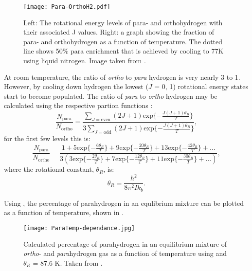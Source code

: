  \begin{figure*}
   \begin{center}
   \texttt{[image: Para-OrthoH2.pdf]}
   \end{center}
   \caption{Left: The rotational energy levels of para- and orthohydrogen with their associated J values. Right: a graph
   showing the fraction of para- and orthohydrogen as a function of temperature. The dotted line shows 50\% para
   enrichment that is achieved by cooling to 77K using liquid nitrogen. Image taken from \citep{barskiy2017nmr}.}
   \label{fig:POH2}
 \end{figure*}


 At room temperature, the ratio of \textit{ortho} to \textit{para} hydrogen is very nearly 3 to 1. However, by cooling down hydrogen
 the lowest ($J$ = 0, 1) rotational energy states start to become populated. The ratio of \textit{para} to \textit{ortho} hydrogen may be
 calculated using the respective partion functions \citep{GREEN20121}:
\begin{equation}
  \frac{N_{\text{para}}}{N_{\text{ortho}}} = \frac{\sum_{J = \text{even}}(2J+1)\text{exp}\{-\frac{J(J+1)\theta_R}{T}\}}{3\sum_{J = \text{odd}}(2J+1)\text{exp}\{-\frac{J(J+1)\theta_R}{T}\}},
\end{equation}
for the first few levels this is:
\begin{equation}\label{eqn:partition}
  \frac{N_{\text{para}}}{N_{\text{ortho}}} = \frac{1 + 5\text{exp}\{-\frac{6\theta_R}{T}\} + 9\text{exp}\{-\frac{20\theta_R}{T}\} + 13\text{exp}\{-\frac{42\theta_R}{T}\} + \dots}{3(3\text{exp}\{-\frac{2\theta_R}{T}\} + 7\text{exp}\{-\frac{12\theta_R}{T}\} + 11\text{exp}\{-\frac{30\theta_R}{T}\} + \dots)},
\end{equation}
 where the rotational constant, $\theta_R$, is:
 \begin{equation}
   \theta_R = \frac{h^2}{8\pi^2Ik_b}.
 \end{equation}

Using , the percentage of parahydrogen in an equlibrium mixture can be plotted as a function of temperature, shown in .

\begin{figure}[h]
  \begin{center}
  \texttt{[image: ParaTemp-dependance.jpg]}
  \end{center}
  \caption{Calculated percentage of parahydrogen in an equilibrium mixture of \textit{ortho}- and \textit{para}hydrogen gas
  as a function of temperature using  and $\theta_R$ = 87.6 K. Taken from \citep{GREEN20121}.}
  \label{fig:ParaTemp}
\end{figure}

